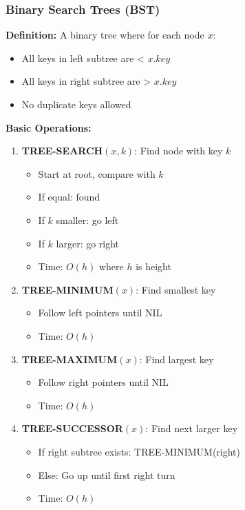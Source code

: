 \subsubsection{Binary Search Trees (BST)}
\textbf{Definition:} A binary tree where for each node $x$:
\begin{itemize}[noitemsep,leftmargin=*]
    \item All keys in left subtree are < $x.key$
    \item All keys in right subtree are > $x.key$
    \item No duplicate keys allowed
\end{itemize}

\textbf{Basic Operations:}
\begin{enumerate}[noitemsep,leftmargin=*]
    \item \textbf{TREE-SEARCH$(x,k)$}: Find node with key $k$
        \begin{itemize}[noitemsep,topsep=0pt]
            \item Start at root, compare with $k$
            \item If equal: found
            \item If $k$ smaller: go left
            \item If $k$ larger: go right
            \item Time: $O(h)$ where $h$ is height
        \end{itemize}
    
    \item \textbf{TREE-MINIMUM$(x)$}: Find smallest key
        \begin{itemize}[noitemsep,topsep=0pt]
            \item Follow left pointers until NIL
            \item Time: $O(h)$
        \end{itemize}
    
    \item \textbf{TREE-MAXIMUM$(x)$}: Find largest key
        \begin{itemize}[noitemsep,topsep=0pt]
            \item Follow right pointers until NIL
            \item Time: $O(h)$
        \end{itemize}
    
    \item \textbf{TREE-SUCCESSOR$(x)$}: Find next larger key
        \begin{itemize}[noitemsep,topsep=0pt]
            \item If right subtree exists: TREE-MINIMUM(right)
            \item Else: Go up until first right turn
            \item Time: $O(h)$
        \end{itemize}
    

\end{enumerate}
